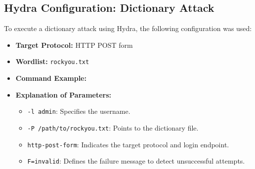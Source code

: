 \documentclass{comjnl}
\begin{document}
\subsection*{Hydra Configuration: Dictionary Attack}
To execute a dictionary attack using Hydra, the following configuration was used:

\begin{itemize}
  \item \textbf{Target Protocol:} HTTP POST form
  \item \textbf{Wordlist:} \texttt{rockyou.txt}
  \item \textbf{Command Example:}
  \item \textbf{Explanation of Parameters:}
  \begin{itemize}
    \item \texttt{-l admin}: Specifies the username.
    \item \texttt{-P /path/to/rockyou.txt}: Points to the dictionary file.
    \item \texttt{http-post-form}: Indicates the target protocol and login endpoint.
    \item \texttt{F=invalid}: Defines the failure message to detect unsuccessful attempts.
  \end{itemize}
\end{itemize}
\end{document}

